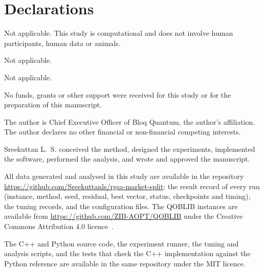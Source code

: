 \documentclass[pdflatex,sn-mathphys-num]{sn-jnl}
\theoremstyle{thmstyleone}
\theoremstyle{thmstylethree}
\begin{document}
\section*{Declarations}

Not applicable. This study is computational and does not involve human participants, human data or animals.

Not applicable.

Not applicable.

No funds, grants or other support were received for this study or for the preparation of this manuscript.

The author is Chief Executive Officer of Bloq Quantum, the author's affiliation. The author declares no other financial or non-financial competing interests.

Sreekuttan L.~S. conceived the method, designed the experiments, implemented the software, performed the analysis, and wrote and approved the manuscript.

All data generated and analysed in this study are available in the repository \url{https://github.com/Sreekuttanls/rgsa-market-split}: the result record of every run (instance, method, seed, residual, best vector, status, checkpoints and timing), the tuning records, and the configuration files. The QOBLIB instances are available from \url{https://github.com/ZIB-AOPT/QOBLIB} under the Creative Commons Attribution 4.0 licence~\cite{koch2025}.

The C++ and Python source code, the experiment runner, the tuning and analysis scripts, and the tests that check the C++ implementation against the Python reference are available in the same repository under the MIT licence.
\end{document}
